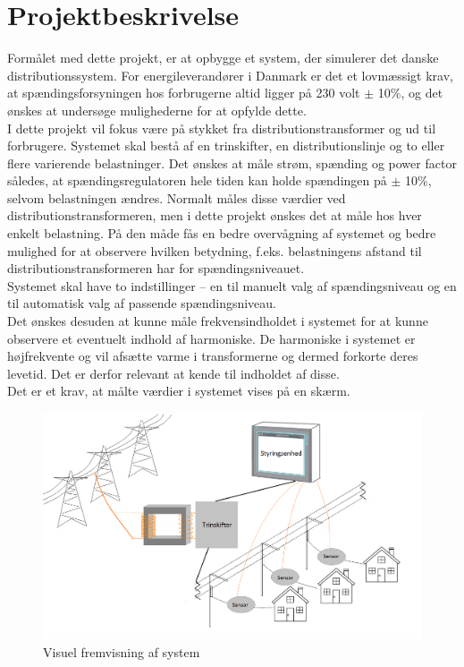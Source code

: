 
\section{Projektbeskrivelse}

Formålet med dette projekt, er at opbygge et system, der simulerer det danske distributionssystem. For energileverandører i Danmark er det et lovmæssigt krav, at spændingsforsyningen hos forbrugerne altid ligger på 230 volt $\pm$ 10$\%$, og det ønskes at undersøge mulighederne for at opfylde dette.\\ 
I dette projekt vil fokus være på stykket fra distributionstransformer og ud til forbrugere. Systemet skal bestå af en trinskifter, en distributionslinje og to eller flere varierende belastninger. Det ønskes at måle strøm, spænding og power factor således, at spændingsregulatoren hele tiden kan holde spændingen på $\pm$ 10$\%$, selvom belastningen ændres. Normalt måles disse værdier ved distributionstransformeren, men i dette projekt ønskes det at måle hos hver enkelt belastning. På den måde fås en bedre overvågning af systemet og bedre mulighed for at observere hvilken betydning, f.eks. belastningens afstand til distributionstransformeren har for spændingsniveauet.\\ Systemet skal have to indstillinger – en til manuelt valg af spændingsniveau og en til automatisk valg af passende spændingsniveau.\\ 
Det ønskes desuden at kunne måle frekvensindholdet i systemet for at kunne observere et eventuelt indhold af harmoniske. De harmoniske i systemet er højfrekvente og vil afsætte varme i transformerne og dermed forkorte deres levetid. Det er derfor relevant at kende til indholdet af disse.\\ 
Det er et krav, at målte værdier i systemet vises på en skærm. 

\begin{figure}[htbp] %
	\centering
	\includegraphics[width=1\textwidth]{Figure/RigtBillede}
	\caption{Visuel fremvisning af system}
	\label{fig:Rigtbillede}
\end{figure}